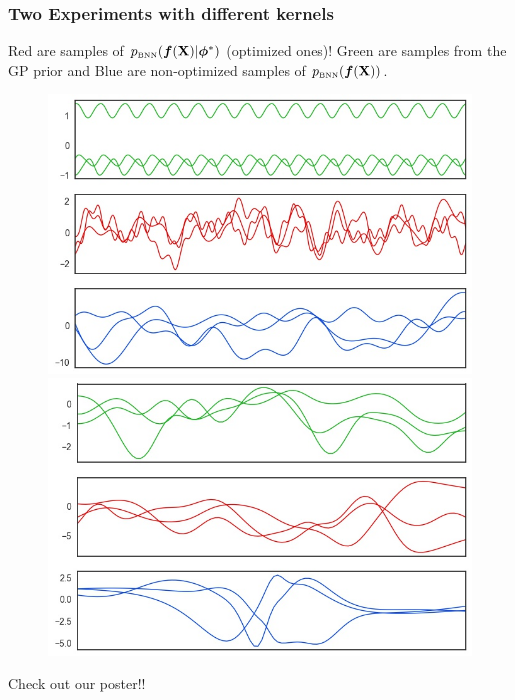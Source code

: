 \documentclass[9pt,serif]{beamer}
\begin{document}
\begin{frame}
\frametitle{Two Experiments with different kernels}

Red are samples of $p_{\text{\tiny BNN}} (\bm f ( \mathbf{X} ) |  \bm \phi^* )$ (optimized ones)! Green are samples from the GP prior and Blue are non-optimized samples of $p_{\text{\tiny BNN}} (\bm f ( \mathbf{X} ) )$.

\begin{figure}[h]\centering
{\includegraphics[width=.48\textwidth]{figs/persin2}}
{\includegraphics[width=.48\textwidth]{figs/rbfrbf}}
\hspace{1.5cm}
\end{figure}

\centering
Check out our poster!!

\end{frame}
\end{document}
